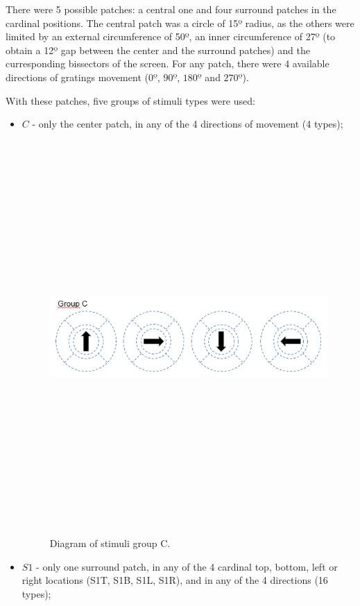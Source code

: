 There were 5 possible patches: a central one and four surround patches in the cardinal positions. The central patch was a circle of 15º radius, as the others were limited by an external circumference of 50º, an inner circumference of 27º (to obtain a 12º gap between the center and the surround patches) and the curresponding bissectors of the screen. For any patch, there were 4 available directions of gratings movement ($0º$, $90º$, $180º$ and $270º$).

With these patches, five groups of stimuli types were used:
\begin{itemize}
\item $C$ - only the center patch, in any of the 4 directions of movement (4 types);

\begin{figure}[h]\centering \includegraphics[width=15cm,height=15cm,keepaspectratio]{Figures/4.Chapter/C.PNG} \caption{Diagram of stimuli group C.} \end{figure}

\item $S1$ - only one surround patch, in any of the 4 cardinal top, bottom, left or right locations (S1T, S1B, S1L, S1R), and in any of the 4 directions (16 types);


\end{itemize}
